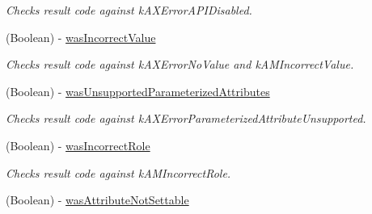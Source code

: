 \begin{DoxyCompactItemize}
\begin{DoxyCompactList}\small\item\em Checks result code against kAXErrorAPIDisabled. \item\end{DoxyCompactList}\item 
\hypertarget{interface_g_d_accessibility_operation_result_ad93fd1d9b2f92ebf357c145d2d3f99b5}{
(Boolean) -\/ \hyperlink{interface_g_d_accessibility_operation_result_ad93fd1d9b2f92ebf357c145d2d3f99b5}{wasIncorrectValue}}
\label{interface_g_d_accessibility_operation_result_ad93fd1d9b2f92ebf357c145d2d3f99b5}

\begin{DoxyCompactList}\small\item\em Checks result code against kAXErrorNoValue and kAMIncorrectValue. \item\end{DoxyCompactList}\item 
\hypertarget{interface_g_d_accessibility_operation_result_a714f2e6b243c9abcb245868adb6d06e3}{
(Boolean) -\/ \hyperlink{interface_g_d_accessibility_operation_result_a714f2e6b243c9abcb245868adb6d06e3}{wasUnsupportedParameterizedAttributes}}
\label{interface_g_d_accessibility_operation_result_a714f2e6b243c9abcb245868adb6d06e3}

\begin{DoxyCompactList}\small\item\em Checks result code against kAXErrorParameterizedAttributeUnsupported. \item\end{DoxyCompactList}\item 
\hypertarget{interface_g_d_accessibility_operation_result_a978ed9d760f2505d5e66b2365b17c024}{
(Boolean) -\/ \hyperlink{interface_g_d_accessibility_operation_result_a978ed9d760f2505d5e66b2365b17c024}{wasIncorrectRole}}
\label{interface_g_d_accessibility_operation_result_a978ed9d760f2505d5e66b2365b17c024}

\begin{DoxyCompactList}\small\item\em Checks result code against kAMIncorrectRole. \item\end{DoxyCompactList}\item 
\hypertarget{interface_g_d_accessibility_operation_result_a4ac68bfd32acf696375682f6cf63fbc0}{
(Boolean) -\/ \hyperlink{interface_g_d_accessibility_operation_result_a4ac68bfd32acf696375682f6cf63fbc0}{wasAttributeNotSettable}}
\label{interface_g_d_accessibility_operation_result_a4ac68bfd32acf696375682f6cf63fbc0}


\end{DoxyCompactItemize}
